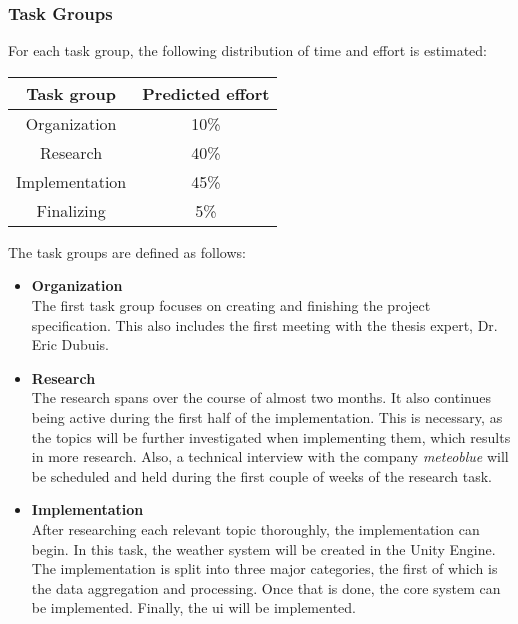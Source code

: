 
\clearpage
\subsubsection{Task Groups}
For each task group, the following distribution of time and effort is estimated:
\emptyline
\begin{tabular}{|c|c|}
    \hline
    \textbf{Task group}  & \textbf{Predicted effort}\\ \hline
    Organization        & 10\%                      \\ \hline
    Research            & 40\%                      \\ \hline
    Implementation      & 45\%                      \\ \hline
    Finalizing          & 5\%                       \\ \hline
\end{tabular}
\vspace{\baselineskip}

\noindent
The task groups are defined as follows:

\begin{itemize}
    \item \textbf{Organization} \\
    The first task group focuses on creating and finishing the project specification.
    This also includes the first meeting with the thesis expert, Dr. Eric Dubuis.
    
    \item \textbf{Research} \\
    The research spans over the course of almost two months. 
    It also continues being active during the first half of the implementation.
    This is necessary, as the topics will be further investigated when implementing them, which results in more research.
    Also, a technical interview with the company \emph{meteoblue} will be scheduled and held during the first couple of weeks of the research task.

    \item \textbf{Implementation} \\
    After researching each relevant topic thoroughly, the implementation can begin.
    In this task, the weather system will be created in the Unity Engine.
    The implementation is split into three major categories, the first of which is the data aggregation and processing. Once that is done, the core system can be implemented. Finally, the \gls{ui} will be implemented.
\end{itemize}

